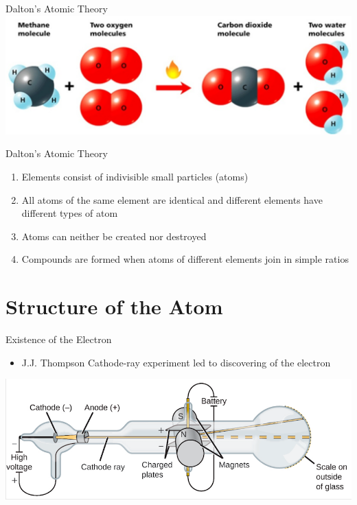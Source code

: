 \documentclass[11pt]{beamer}
\begin{document}
\begin{frame}{Dalton's Atomic Theory}
  \centering
  \includegraphics[scale=0.175]{methane_burn}
\end{frame}

\begin{frame}{Dalton's Atomic Theory}
  \begin{enumerate}
  \item Elements consist of indivisible small particles (atoms)
  \item All atoms of the same element are identical and
    different elements have different types of atom
  \item Atoms can neither be created nor destroyed
  \item Compounds are formed when atoms of different
    elements join in simple ratios
  \end{enumerate}
\end{frame}

\section{Structure of the Atom}

\begin{frame}{Existence of the Electron}
  \begin{itemize}
  \item J.J. Thompson Cathode-ray experiment led to
    discovering of the electron
  \end{itemize}

  \centering
  \includegraphics[scale=0.3]{cathod_ray}
\end{frame}
\end{document}
